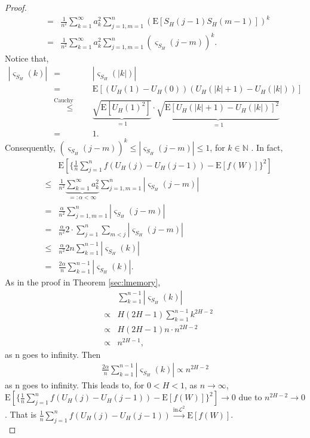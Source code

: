 \documentclass[a4paper, twoside, 11pt]{article}
\theoremstyle{definition}
\begin{document}
\begin{proof}
\begin{eqnarray*}
	  &=& \frac{1}{n^2} \sum\limits_{k=1}^\infty a_k^2\sum\limits_{j=1, m=1}^n (\mathrm{E}[S_H(j-1) S_H(m-1)])^k\\
	  &=& \frac{1}{n^2} \sum\limits_{k=1}^\infty a_k^2\sum\limits_{j=1, m=1}^n (\varsigma_{S_H}(j-m))^k.
	\end{eqnarray*}
	  Notice that,
	  \begin{eqnarray*}
		|\varsigma_{S_H}(k)| &=& |\varsigma_{S_H}(|k|)|\\
		&=& \mathrm{E}[(U_H(1) - U_H(0))(U_H(|k|+1)-U_H(|k|))]\\
		&\overset{\text{Cauchy Schwartz}}{\le}& \underbrace{\sqrt{\mathrm{E}[U_H(1)^2]}}_{= 1}\cdot \underbrace{\sqrt{\mathrm{E}[U_H(|k|+1) - U_H(|k|)]^2}}_{= 1}\\
		&=& 1.
	  \end{eqnarray*}
	  Consequently, $(\varsigma_{S_H}(j-m))^k \le |\varsigma_{S_H}(j-m)| \le 1$, for $k\in \mathbb{N}$ . In fact,
	  \begin{eqnarray*}
		&& \mathrm{E}[\{\frac{1}{n}\sum\limits_{j=1}^n f(U_H(j) - U_H(j-1)) - \mathrm{E}[f(W)]\}^2]\\
		&\le& \frac{1}{n^2} \underbrace{\sum\limits_{k=1}^\infty a_k^2}_{=:\alpha < \infty}\sum\limits_{j=1, m=1}^n |\varsigma_{S_H}(j-m)|\\
		&=& \frac{\alpha}{n^2} \sum\limits_{j=1, m=1}^n |\varsigma_{S_H}(j-m)|\\
		&=& \frac{\alpha}{n^2} 2 \cdot \sum\limits_{j=1}^n  \sum\limits_{m<j} |\varsigma_{S_H}(j-m)|\\
		&\le& \frac{\alpha}{n^2} 2n \sum\limits_{k=1}^{n-1} |\varsigma_{S_H}(k)|\\
		&=& \frac{2\alpha}{n}  \sum\limits_{k=1}^{n-1} |\varsigma_{S_H}(k)|.
	  \end{eqnarray*}
	  As in the proof in Theorem \ref{sec:lmemory}, 
	  \begin{eqnarray*}
	  &&\sum\limits_{k=1}^{n-1} |\varsigma_{S_H}(k)| \\
	  &\propto& H(2H-1)\sum\limits_{k=1}^{n-1}k^{2H-2} \\
	  &\propto& H(2H-1)n\cdot n^{2H-2} \\
	  &\propto& n^{2H-1}, 
	\end{eqnarray*}
	as n goes to infinity. Then
	  \begin{eqnarray*}
		\frac{2\alpha}{n} \sum\limits_{k=1}^{n-1} |\varsigma_{S_H}(k)| \propto n^{2H-2}
	  \end{eqnarray*}
	  as n goes to infinity. This leads to,  for $0<H<1$, as $n \rightarrow \infty$,  $\mathrm{E}[\{\frac{1}{n}\sum\limits_{j=1}^n f(U_H(j) - U_H(j-1)) - \mathrm{E}[f(W)]\}^2]\rightarrow 0$ due to $n^{2H-2}\rightarrow 0$. That is $\frac{1}{n}\sum\limits_{j=1}^n f(U_H(j) - U_H(j-1)) \overset{\text{in} \mathcal{L}^2}{\rightarrow} \mathrm{E}[f(W)]$.\\


\end{proof}
\end{document}
